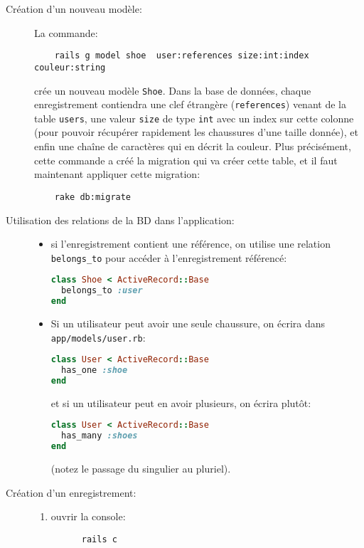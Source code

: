 \documentclass{article}
\begin{document}
\begin{description}
\item[Création d'un nouveau modèle:] La commande:\\
  \begin{lstlisting}
    rails g model shoe  user:references size:int:index couleur:string
  \end{lstlisting}
  crée un nouveau modèle \texttt{Shoe}. Dans la base de données,
  chaque enregistrement contiendra une clef étrangère
  (\texttt{references}) venant de la table \texttt{users}, une valeur
  \texttt{size} de type \texttt{int} avec un index sur cette colonne
  (pour pouvoir récupérer rapidement les chaussures d'une taille
  donnée), et enfin une chaîne de caractères qui en décrit la couleur.
  Plus précisément, cette commande a créé la migration qui va créer cette table,
  et il faut maintenant appliquer cette migration:
  \begin{lstlisting}
    rake db:migrate
  \end{lstlisting}
\item[Utilisation des relations de la BD dans l'application:] 
  \begin{itemize}
  \item si l'enregistrement contient une référence, on utilise une
    relation \texttt{belongs\_to} pour accéder à l'enregistrement
    référencé:
    \begin{lstlisting}[language=ruby]
class Shoe < ActiveRecord::Base
  belongs_to :user
end
    \end{lstlisting}
  \item Si un utilisateur peut avoir une seule chaussure, on écrira
    dans \texttt{app/models/user.rb}:
    \begin{lstlisting}[language=ruby]
class User < ActiveRecord::Base
  has_one :shoe
end
    \end{lstlisting}
et si un utilisateur peut en avoir plusieurs, on écrira plutôt:
    \begin{lstlisting}[language=ruby]
class User < ActiveRecord::Base
  has_many :shoes
end
    \end{lstlisting}
    (notez le passage du singulier au pluriel).
  \end{itemize}
\item[Création d'un enregistrement:] 
  \begin{enumerate}
  \item ouvrir la console:
    \begin{lstlisting}
      rails c
    \end{lstlisting}

\end{enumerate}
\end{description}
\end{document}
